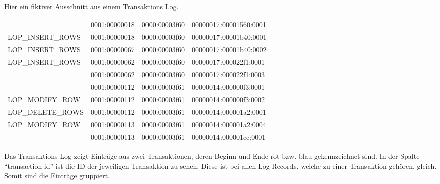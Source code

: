           Hier ein fiktiver Ausschnitt aus einem Transaktions Log.
          \begin{center}
            \begin{small}
            \label{transprot}
              \tabletail{
              }
              \tablelasttail{
              }
              \begin{msoraclesql}
                \begin{supertabular}{llll}
                  \color{red}{LOP\_BEGIN\_XACT} & 0001:00000018 & 0000:00003f60
                  & 00000017:00001560:0001 \\
                  LOP\_INSERT\_ROWS & 0001:00000018 & 0000:00003f60 &
                  00000017:00001b40:0001 \\
                  LOP\_INSERT\_ROWS & 0001:00000067 & 0000:00003f60 &
                  00000017:00001b40:0002 \\
                  LOP\_INSERT\_ROWS & 0001:00000062 & 0000:00003f60 &
                  00000017:000022f1:0001 \\
                  \color{red}{LOP\_COMMIT\_XACT} & 0001:00000062 & 0000:00003f60
                  & 00000017:000022f1:0003 \\
                  \color{blue}{LOP\_BEGIN\_XACT} & 0001:00000112 & 0000:00003f61
                  & 00000014:000000f3:0001 \\
                  LOP\_MODIFY\_ROW & 0001:00000112 & 0000:00003f61 &
                  00000014:000000f3:0002 \\
                  LOP\_DELETE\_ROWS & 0001:00000112 & 0000:00003f61 &
                  00000014:000001a2:0001 \\
                  LOP\_MODIFY\_ROW & 0001:00000113 & 0000:00003f61 &
                  00000014:000001a2:0004 \\
                  \color{blue}{LOP\_COMMIT\_XACT} & 0001:00000113 &
                  0000:00003f61 & 00000014:000001cc:0001 \\
                \end{supertabular}
              \end{msoraclesql}
            \end {small}
          \end{center}
          Das Transaktions Log zeigt Einträge aus zwei Transaktionen, deren
          Beginn und Ende rot bzw. blau gekennzeichnet sind. In der Spalte
          \enquote{transaction id} ist die ID der jeweiligen Transaktion zu
          sehen. Diese ist bei allen Log Records, welche zu einer Transaktion
          gehören, gleich. Somit sind die Einträge gruppiert.
          
